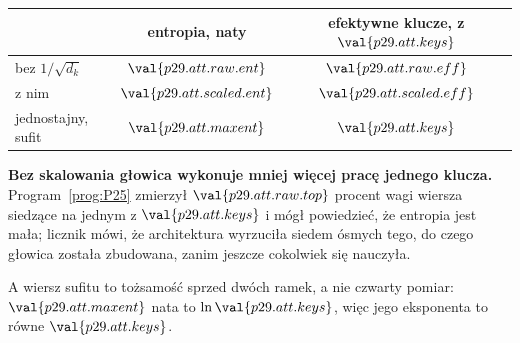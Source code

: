 \begin{fr}

\begin{center}
\begin{tabular}{lcc}
\toprule
 & entropia, naty & efektywne klucze, z $\val{p29.att.keys}$ \\
\midrule
bez $1/\sqrt{d_k}$ & $\val{p29.att.raw.ent}$
  & $\val{p29.att.raw.eff}$ \\
z nim & $\val{p29.att.scaled.ent}$
  & $\val{p29.att.scaled.eff}$ \\
\midrule
jednostajny, sufit & $\val{p29.att.maxent}$
  & $\val{p29.att.keys}$ \\
\bottomrule
\end{tabular}
\end{center}

\textbf{Bez skalowania głowica wykonuje mniej więcej pracę jednego klucza.}
Program~\ref{prog:P25} zmierzył $\val{p29.att.raw.top}$ procent wagi wiersza
siedzące na jednym z $\val{p29.att.keys}$ i mógł powiedzieć, że entropia jest
mała; licznik mówi, że architektura wyrzuciła siedem ósmych tego, do czego
głowica została zbudowana, zanim jeszcze cokolwiek się nauczyła.

A wiersz sufitu to tożsamość sprzed dwóch ramek, a nie czwarty pomiar:
$\val{p29.att.maxent}$ nata to $\ln \val{p29.att.keys}$, więc jego eksponenta
to równe $\val{p29.att.keys}$.
\end{fr}

